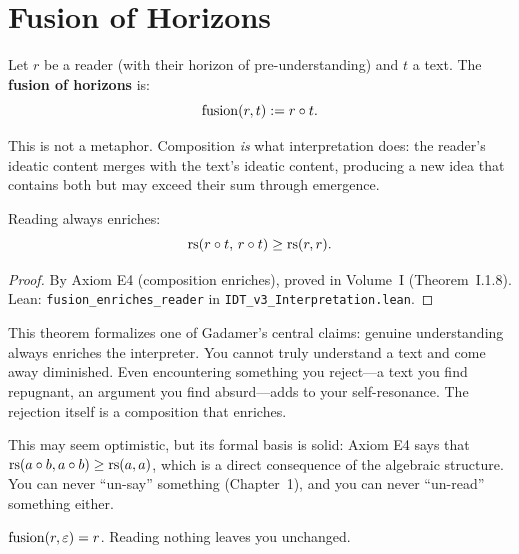 \section{Fusion of Horizons}

\begin{definition}
\label{def:fusion}
Let $r$ be a reader (with their horizon of pre-understanding) and $t$ a text.
The \textbf{fusion of horizons} is:
\[
\mathrm{fusion}(r, t) := r \circ t.
\]
\end{definition}

This is not a metaphor. Composition \emph{is} what interpretation does:
the reader's ideatic content merges with the text's ideatic content, producing
a new idea that contains both but may exceed their sum through emergence.

\begin{theorem}
\label{thm:fusion-enriches}
Reading always enriches:
\[
\mathrm{rs}(r \circ t,\, r \circ t) \geq \mathrm{rs}(r, r).
\]
\end{theorem}

\begin{proof}
By Axiom E4 (composition enriches), proved in Volume~I (Theorem~I.1.8).
Lean: \texttt{fusion\_enriches\_reader} in \texttt{IDT\_v3\_Interpretation.lean}.
\end{proof}

\begin{interpretation}
\label{interp:gadamer-enrichment}
This theorem formalizes one of Gadamer's central claims: genuine understanding
always enriches the interpreter. You cannot truly understand a text and come
away diminished. Even encountering something you reject---a text you find
repugnant, an argument you find absurd---adds to your self-resonance. The
rejection itself is a composition that enriches.

This may seem optimistic, but its formal basis is solid: Axiom E4 says that
$\mathrm{rs}(a \circ b, a \circ b) \geq \mathrm{rs}(a,a)$, which is a direct consequence
of the algebraic structure. You can never ``un-say'' something (Chapter~1),
and you can never ``un-read'' something either.
\end{interpretation}

\begin{theorem}
\label{thm:fusion-void-text}
$\mathrm{fusion}(r, \varepsilon) = r$. Reading nothing leaves you unchanged.
\end{theorem}

